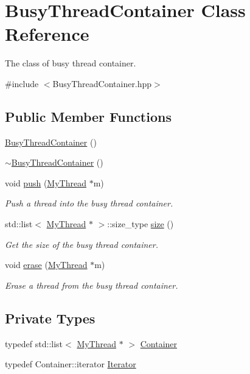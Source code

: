 \hypertarget{classBusyThreadContainer}{}\section{Busy\+Thread\+Container Class Reference}
\label{classBusyThreadContainer}


The class of busy thread container.  




{\ttfamily \#include $<$Busy\+Thread\+Container.\+hpp$>$}

\subsection*{Public Member Functions}
\begin{DoxyCompactItemize}
\item 
\hyperlink{classBusyThreadContainer_a77719862a87674e9b7f012d3f3aceac2}{Busy\+Thread\+Container} ()
\item 
\hyperlink{classBusyThreadContainer_ab71b388d1a6ecf1d0c977ebce7fa3f3a}{$\sim$\+Busy\+Thread\+Container} ()
\item 
void \hyperlink{classBusyThreadContainer_a601b1d5736511f3d07ed506b179c9433}{push} (\hyperlink{classMyThread}{My\+Thread} $\ast$m)
\begin{DoxyCompactList}\small\item\em Push a thread into the busy thread container. \end{DoxyCompactList}\item 
std\+::list$<$ \hyperlink{classMyThread}{My\+Thread} $\ast$ $>$\+::size\+\_\+type \hyperlink{classBusyThreadContainer_ab84986bf500d5e527b022a75be74d0f6}{size} ()
\begin{DoxyCompactList}\small\item\em Get the size of the busy thread container. \end{DoxyCompactList}\item 
void \hyperlink{classBusyThreadContainer_aacfa7ece73b73ef5036f49979f4412e9}{erase} (\hyperlink{classMyThread}{My\+Thread} $\ast$m)
\begin{DoxyCompactList}\small\item\em Erase a thread from the busy thread container. \end{DoxyCompactList}\end{DoxyCompactItemize}
\subsection*{Private Types}
\begin{DoxyCompactItemize}
\item 
typedef std\+::list$<$ \hyperlink{classMyThread}{My\+Thread} $\ast$ $>$ \hyperlink{classBusyThreadContainer_ab3e046394f1969fb1f43ea358c1c6950}{Container}
\item 
typedef Container\+::iterator \hyperlink{classBusyThreadContainer_acc7f249156d5ed707acefe652f07fb18}{Iterator}
\end{DoxyCompactItemize}
